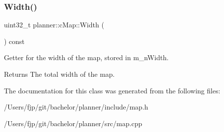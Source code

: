 \subsubsection{\texorpdfstring{Width()}{Width()}}
{\footnotesize\ttfamily uint32\+\_\+t planner\+::c\+Map\+::\+Width (\begin{DoxyParamCaption}{ }\end{DoxyParamCaption}) const\hspace{0.3cm}{\ttfamily [inline]}}



Getter for the width of the map, stored in m\+\_\+n\+Width. 

\begin{DoxyReturn}{Returns}
The total width of the map. 
\end{DoxyReturn}


The documentation for this class was generated from the following files\+:\begin{DoxyCompactItemize}
\item 
/\+Users/fjp/git/bachelor/planner/include/map.\+h\item 
/\+Users/fjp/git/bachelor/planner/src/map.\+cpp\end{DoxyCompactItemize}
